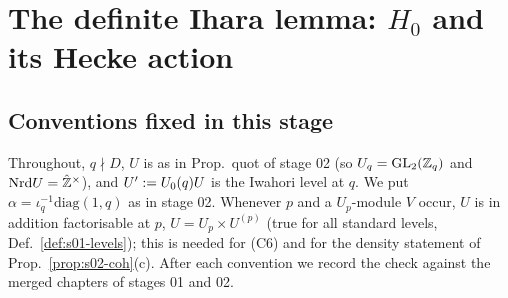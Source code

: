 \section{The definite Ihara lemma: \texorpdfstring{$H_0$}{H0} and its Hecke action}\label{ss:s03-ihara}

\subsection{Conventions fixed in this stage}\label{ss:s03-conv}
Throughout, $q\nmid D$, $U$ is as in Prop.~quot of stage 02 (so $U_q=\mathrm{GL}_2(\mathbb{Z}_q)$ and $\mathrm{Nrd} U=\hat{\mathbb{Z}}^\times$), and
$U':=U_0(q)U$ is the Iwahori level at $q$. We put $\alpha=\iota_q^{-1}\mathrm{diag}(1,q)$ as in stage 02. Whenever $p$ and a $U_p$-module
$V$ occur, $U$ is in addition factorisable at $p$, $U=U_p\times U^{(p)}$ (true for all standard levels, Def.~\ref{def:s01-levels}); this is
needed for (C6) and for the density statement of Prop.~\ref{prop:s02-coh}(c). After each convention we record the check against the merged
chapters of stages 01 and 02.
